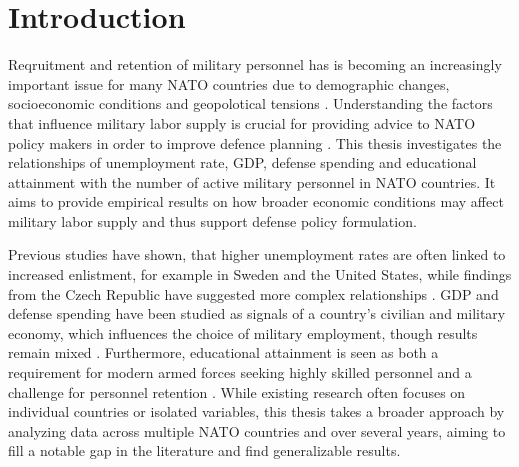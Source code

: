 \chapter{Introduction}

Reqruitment and retention of military personnel has is becoming an increasingly 
important issue for many NATO countries due to demographic changes, socioeconomic 
conditions and geopolotical tensions \parencite{nato_research_and_technology_organization_recruiting_2007,noauthor_strategic_concept_nodate}.
Understanding the factors that influence military labor supply is crucial for providing 
advice to NATO policy makers in order to improve defence planning \parencite{nato_research_and_technology_organization_recruiting_2007}.
This thesis investigates the relationships of
unemployment rate, GDP, defense spending and educational attainment with
the number of active military personnel in NATO countries.
It aims to provide empirical results on how broader economic conditions 
may affect military labor supply and thus support defense policy formulation.

Previous studies have shown, that higher unemployment rates are often 
linked to increased enlistment, for example in Sweden and the United States, 
while findings from the Czech Republic have suggested more complex relationships
\parencite{backstrom_are_2019,asch_cash_2010,holcner_military_2021}. 
GDP and defense spending have been studied as signals of a country’s 
civilian and military economy, which influences the choice of military employment, 
though results remain mixed \parencite{warner_chapter_1995,holcner_military_2021}. 
Furthermore, educational attainment is seen as both a requirement for modern armed forces seeking highly skilled personnel 
and a challenge for personnel retention
\parencite{cnas_resources_and_force_readiness_division_fiscal_nodate,hof_quality_2023}. 
While existing research 
often focuses on individual countries or isolated variables, this thesis takes a 
broader approach by analyzing data across multiple NATO countries and over several years, 
aiming to fill a notable gap in the literature and find generalizable results.
